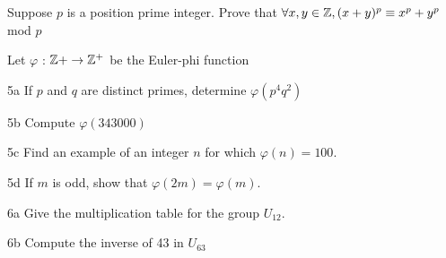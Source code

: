 
\begin{question}{4}
Suppose $p$ is a position prime integer. Prove that $\forall x,y \in \mathbb{Z}, (x+y)^p \equiv x^p + y^p$ mod $p$
\end{question}


\begin{question}{5}
Let $\varphi$ : $\mathbb{Z}+ \rightarrow \mathbb{Z}^+$ be the Euler-phi function
\end{question}


\begin{question}{5a}
If $p$ and $q$ are distinct primes, determine $\varphi(p^4q^2)$
\end{question}

\begin{question}{5b}
Compute $\varphi(343000)$
\end{question}

\begin{question}{5c}
Find an example of an integer $n$ for which $\varphi(n) = 100$.
\end{question}

\begin{question}{5d}
If $m$ is odd, show that $\varphi(2m) = \varphi(m).$
\end{question}






\begin{question}{6a}
Give the multiplication table for the group $U_{12}$.
\end{question}

\begin{question}{6b}
Compute the inverse of 43 in $U_{63}$
\end{question}




